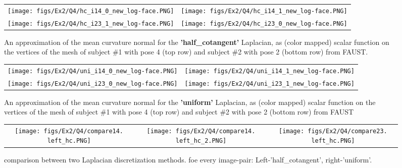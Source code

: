 \begin{figure*}[h]
\centering
\begin{tabular}{cc}
    \texttt{[image: figs/Ex2/Q4/hc\_i14\_0\_new\_log-face.PNG]} &
    \texttt{[image: figs/Ex2/Q4/hc\_i14\_1\_new\_log-face.PNG]} \\ 
    \texttt{[image: figs/Ex2/Q4/hc\_i23\_1\_new\_log-face.PNG]} &
    \texttt{[image: figs/Ex2/Q4/hc\_i23\_0\_new\_log-face.PNG]}
\end{tabular}
 \caption{\small An approximation of the mean curvature normal for the \textbf{'half\_cotangent'} Laplacian, as (color mapped) scalar
function on the vertices of the mesh of subject \#1 with pose 4 (top row) and subject \#2 with pose 2 (bottom row) from FAUST.}
 \label{fig:hc_mcurve}
\end{figure*}

\begin{figure*}[h]
\centering
\begin{tabular}{cc}
    \texttt{[image: figs/Ex2/Q4/uni\_i14\_0\_new\_log-face.PNG]} &
    \texttt{[image: figs/Ex2/Q4/uni\_i14\_1\_new\_log-face.PNG]} \\
    \texttt{[image: figs/Ex2/Q4/uni\_i23\_0\_new\_log-face.PNG]} &
    \texttt{[image: figs/Ex2/Q4/uni\_i23\_1\_new\_log-face.PNG]}
\end{tabular}
 \caption{\small An approximation of the mean curvature normal for the \textbf{'uniform'} Laplacian, as (color mapped) scalar
function on the vertices of the mesh of subject \#1 with pose 4 (top row) and subject \#2 with pose 2 (bottom row) from FAUST}
 \label{fig:uni_mcurve}
\end{figure*}


\begin{figure*}[h]
\centering
\begin{tabular}{ccc}
    \texttt{[image: figs/Ex2/Q4/compare14. left\_hc.PNG]} &
    \texttt{[image: figs/Ex2/Q4/compare14. left\_hc\_2.PNG]} &
    \texttt{[image: figs/Ex2/Q4/compare23. left\_hc.PNG]}
\end{tabular}
 \caption{\small comparison between two Laplacian discretization methods. foe every image-pair: Left-'half\_cotangent', right-'uniform'.}
 \label{fig:hc_mcurve_compare}
\end{figure*}


